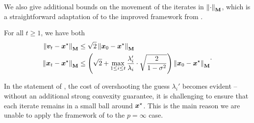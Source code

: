 We also give additional bounds on the movement of the iterates in $\left\lVert \cdot \right\rVert_{\mathbf{M}}$, which is a straightforward adaptation of \cite[Lemma 31]{msbacon} to the improved framework from \cite{chjjs22}.

\begin{lemma}
\label{lemma:ms_acceleration_iterate_diameter}
For all $t\ge 1$, we have both
\begin{equation*}
    \begin{aligned}
        \left\lVert \bm{v}_t-\bm{x}^{\star} \right\rVert_{\mathbf{M}} &\le \sqrt{2}\left\lVert \bm{x}_0-\bm{x}^{\star} \right\rVert_{\mathbf{M}} \\
        \left\lVert \bm{x}_t-\bm{x}^{\star} \right\rVert_{\mathbf{M}} &\le \left(\sqrt{2}+\max_{1 \le i \le t} \frac{\lambda_i'}{\lambda_i} \cdot \sqrt{\frac{2}{1-\sigma^2}}\right)\left\lVert \bm{x}_0-\bm{x}^{\star} \right\rVert_{\mathbf{M}}
    \end{aligned}.
\end{equation*}
\end{lemma}

In the statement of , the cost of overshooting the guess $\lambda_i'$ becomes evident -- without an additional strong convexity guarantee, it is challenging to ensure that each iterate remains in a small ball around $\bm{x}^{\star}$. This is the main reason we are unable to apply the framework of \cite{chjjs22} to the $p=\infty$ case.


